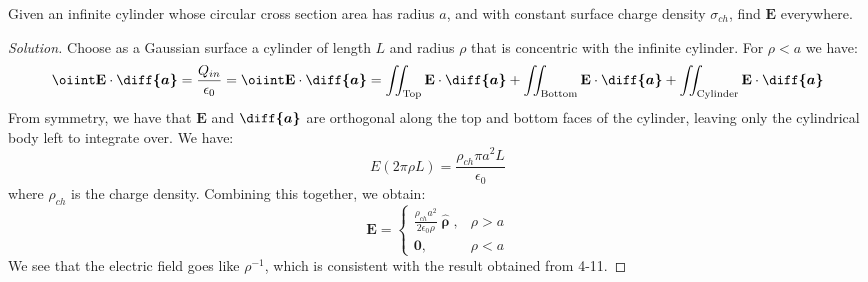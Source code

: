 \documentclass[crop=false,class=book,oneside]{standalone}
\begin{document}
            \begin{problem}[Wangsness 4-7]
                Given an infinite cylinder whose circular
                cross section area has radius $a$, and with
                constant surface charge density $\sigma_{ch}$,
                find $\mathbf{E}$ everywhere.
            \end{problem}
            \begin{proof}[Solution]
                Choose as a Gaussian surface a cylinder of length
                $L$ and radius $\rho$ that is concentric with the
                infinite cylinder. For $\rho<a$ we have:
                \begin{equation*}
                    \oiint\mathbf{E}\cdot\boldsymbol{\diff{a}}
                    =\frac{Q_{in}}{\epsilon_{0}}
                    =\oiint\mathbf{E}\cdot\boldsymbol{\diff{a}}
                    =\iint_{\textrm{Top}}
                    \mathbf{E}\cdot\boldsymbol{\diff{a}}
                    +\iint_{\textrm{Bottom}}
                    \mathbf{E}\cdot\boldsymbol{\diff{a}}
                    +\iint_{\textrm{Cylinder}}
                    \mathbf{E}\cdot\boldsymbol{\diff{a}}
                \end{equation*}
                From symmetry, we have that $\mathbf{E}$ and
                $\boldsymbol{\diff{a}}$ are orthogonal along the
                top and bottom faces of the cylinder, leaving only
                the cylindrical body left to integrate over. We have:
                \begin{equation*}
                    E(2\pi\rho{L})
                    =\frac{\rho_{ch}\pi{a}^{2}L}{\epsilon_{0}}
                \end{equation*}
                where $\rho_{ch}$ is the charge density.
                Combining this together, we obtain:
                \begin{equation*}
                    \mathbf{E}=
                    \begin{cases}
                        \frac{\rho_{ch}a^{2}}{2\epsilon_{0}\rho}
                        \hat{\boldsymbol{\uprho}},
                        &\rho>a\\
                        \mathbf{0},&\rho<a
                    \end{cases}
                \end{equation*}
                We see that the electric field goes like $\rho^{-1}$,
                which is consistent with the result obtained from 4-11.
            \end{proof}
\end{document}
